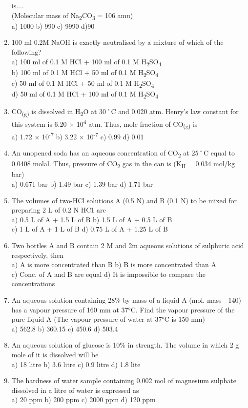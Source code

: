 \begin{enumerate}
  is....\\
  (Molecular mass of Na\textsubscript{2}CO\textsubscript{3} = 106 amu)\\
  a) 1000 b) 990 c) 9990 d)90
\item
  100 ml 0.2M NaOH is exactly neutralised by a mixture of which of the
  following?\\
  a) 100 ml of 0.1 M HCl + 100 ml of 0.1 M
  H\textsubscript{2}SO\textsubscript{4\\
  }b) 100 ml of 0.1 M HCl + 50 ml of 0.1 M
  H\textsubscript{2}SO\textsubscript{4\\
  }c) 50 ml of 0.1 M HCl + 50 ml of 0.1 M
  H\textsubscript{2}SO\textsubscript{4\\
  }d) 50 ml of 0.1 M HCl + 100 ml of 0.1 M
  H\textsubscript{2}SO\textsubscript{4}
\item
  CO\textsubscript{(g)} is dissolved in H\textsubscript{2}O at 30˚C and
  0.020 atm. Henry's law constant for this system is 6.20 ×
  10\textsuperscript{4} atm. Thus, mole fraction of
  CO\textsubscript{(g)} is\\
  a) 1.72 × 10\textsuperscript{-7} b) 3.22 × 10\textsuperscript{-7} c)
  0.99 d) 0.01
\item
  An unopened soda has an aqueous concentration of CO\textsubscript{2}
  at 25˚C equal to 0.0408 molal. Thus, pressure of CO\textsubscript{2}
  gas in the can is (K\textsubscript{H} = 0.034 mol/kg bar)\\
  a) 0.671 bar b) 1.49 bar c) 1.39 bar d) 1.71 bar
\item
  The volumes of two-HCl solutions A (0.5 N) and B (0.1 N) to be mixed
  for preparing 2 L of 0.2 N HC1 are\\
  a) 0.5 L of A + 1.5 L of B b) 1.5 L of A + 0.5 L of B\\
  c) 1 L of A + 1 L of B d) 0.75 L of A + 1.25 L of B
\item
  Two bottles A and B contain 2 M and 2m aqueous solutions of sulphuric
  acid respectively, then\\
  a) A is more concentrated than B b) B is more concentrated than A\\
  c) Conc. of A and B are equal d) It is impossible to compare the
  concentrations
\item
  An aqueous solution containing 28\% by mass of a liquid A (mol. mass -
  140) has a vapour pressure of 160 mm at 37°C. Find the vapour pressure
  of the pure liquid A (The vapour pressure of water at 37°C is 150
  mm)\\
  a) 562.8 b) 360.15 c) 450.6 d) 503.4
\item
  An aqueous solution of glucose is 10\% in strength. The volume in
  which 2 g mole of it is dissolved will be\\
  a) 18 litre b) 3.6 litre c) 0.9 litre d) 1.8 lite
\item
  The hardness of water sample containing 0.002 mol of magnesium
  sulphate dissolved in a litre of water is expressed as\\
  a) 20 ppm b) 200 ppm c) 2000 ppm d) 120 ppm
\end{enumerate}

